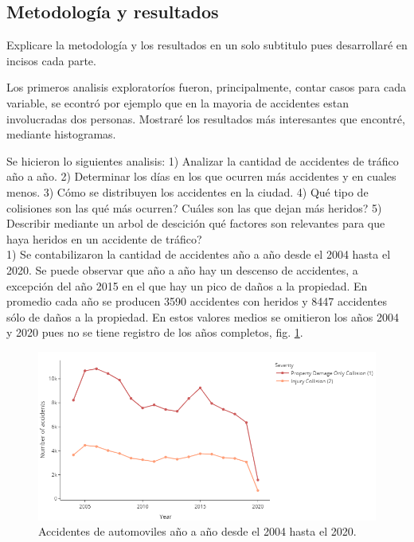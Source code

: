 \documentclass[12pt]{article}
\begin{document}
\subsection*{Metodología y resultados}
Explicare la metodología y los resultados en un solo subtitulo pues desarrollaré en incisos cada parte.

 Los primeros analisis exploratoríos fueron, principalmente, contar casos para cada variable, se econtró por ejemplo que en la mayoria de accidentes estan involucradas dos personas. Mostraré los resultados más interesantes que encontré, mediante histogramas. 


     Se hicieron lo siguientes analisis: 1) Analizar la cantidad de accidentes de tráfico año a año. 2) Determinar los días en los que ocurren más accidentes y en cuales menos. 3) Cómo se distribuyen los accidentes en la ciudad. 4) Qué tipo de colisiones son las qué más ocurren? Cuáles son las que dejan más heridos? 5) Describir mediante un arbol de descición qué factores son relevantes para que haya heridos en un accidente de tráfico? \\

     1) Se contabilizaron la cantidad de accidentes año a año desde el 2004 hasta el 2020. Se puede observar que año a año hay un descenso de accidentes, a excepción del año 2015 en el que hay un pico de daños a la propiedad. En promedio cada año se producen 3590 accidentes con heridos y 8447 accidentes sólo de daños a la propiedad. En estos valores medios se omitieron los años 2004 y 2020 pues no se tiene registro de los años completos, fig. \ref{fig:years}. \\

      

  \begin{figure}[htbp]
    \centering
      \includegraphics[width=1\textwidth]{../images/years.png}
    \caption{Accidentes de automoviles año a año desde el 2004 hasta el 2020.}
    \label{fig:years}
  \end{figure}
\end{document}
